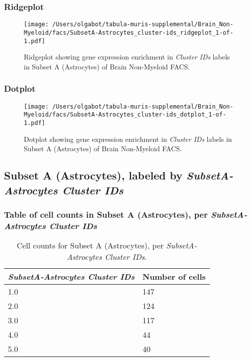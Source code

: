 \clearpage

\subsubsection{Ridgeplot}
\begin{figure}[h]
\centering
\texttt{[image: /Users/olgabot/tabula-muris-supplemental/Brain\_Non-Myeloid/facs/SubsetA-Astrocytes\_cluster-ids\_ridgeplot\_1-of-1.pdf]}

\caption{ Ridgeplot  showing gene expression enrichment in \emph{Cluster IDs} labels in Subset A (Astrocytes) of Brain Non-Myeloid FACS. }
\end{figure}


\clearpage

\subsubsection{Dotplot}
\begin{figure}[h]
\centering
\texttt{[image: /Users/olgabot/tabula-muris-supplemental/Brain\_Non-Myeloid/facs/SubsetA-Astrocytes\_cluster-ids\_dotplot\_1-of-1.pdf]}

\caption{ Dotplot  showing gene expression enrichment in \emph{Cluster IDs} labels in Subset A (Astrocytes) of Brain Non-Myeloid FACS. }
\end{figure}


\clearpage

\subsection{Subset A (Astrocytes), labeled by \emph{SubsetA-Astrocytes Cluster IDs}}
\subsubsection{Table of cell counts in Subset A (Astrocytes), per \emph{SubsetA-Astrocytes Cluster IDs}}\begin{table}[h]
\centering
\label{my-label}
\begin{tabular}{@{}ll@{}}
\toprule

\emph{SubsetA-Astrocytes Cluster IDs}& Number of cells \\ \midrule
1.0 & 147 \\

2.0 & 124 \\

3.0 & 117 \\

4.0 & 44 \\

5.0 & 40 \\
\bottomrule
\end{tabular}
\caption{Cell counts for Subset A (Astrocytes), per \emph{SubsetA-Astrocytes Cluster IDs}.}
\end{table}

